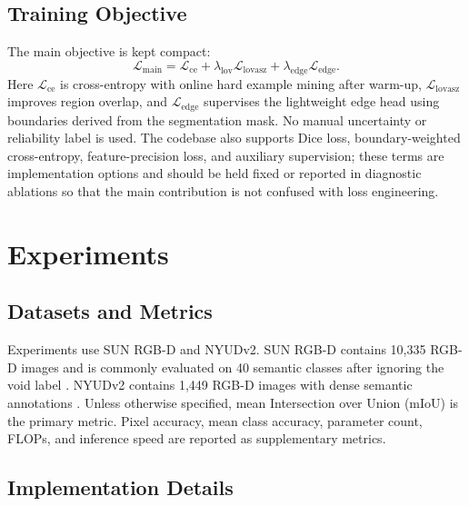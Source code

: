 \documentclass[a4paper,fleqn]{cas-dc}
\begin{document}
\subsection{Training Objective}

The main objective is kept compact:
\begin{equation}
  \mathcal{L}_{\mathrm{main}}
  =
  \mathcal{L}_{\mathrm{ce}}
  +\lambda_{\mathrm{lov}}\mathcal{L}_{\mathrm{lovasz}}
  +\lambda_{\mathrm{edge}}\mathcal{L}_{\mathrm{edge}}.
\end{equation}
Here $\mathcal{L}_{\mathrm{ce}}$ is cross-entropy with online hard example mining after warm-up, $\mathcal{L}_{\mathrm{lovasz}}$ improves region overlap, and $\mathcal{L}_{\mathrm{edge}}$ supervises the lightweight edge head using boundaries derived from the segmentation mask. No manual uncertainty or reliability label is used. The codebase also supports Dice loss, boundary-weighted cross-entropy, feature-precision loss, and auxiliary supervision; these terms are implementation options and should be held fixed or reported in diagnostic ablations so that the main contribution is not confused with loss engineering.

\section{Experiments}\label{sec:experiments}

\subsection{Datasets and Metrics}

Experiments use SUN RGB-D and NYUDv2. SUN RGB-D contains 10,335 RGB-D images and is commonly evaluated on 40 semantic classes after ignoring the void label \citep{song2015sun}. NYUDv2 contains 1,449 RGB-D images with dense semantic annotations \citep{silberman2012nyud}. Unless otherwise specified, mean Intersection over Union (mIoU) is the primary metric. Pixel accuracy, mean class accuracy, parameter count, FLOPs, and inference speed are reported as supplementary metrics.

\subsection{Implementation Details}
\end{document}
